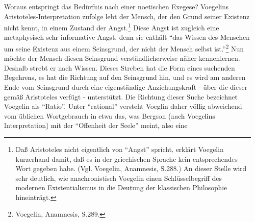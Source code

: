 Woraus entspringt das Bedürfnis nach einer noetischen Exegese? Voegelins
Aristoteles-Interpretation zufolge lebt der Mensch, der den Grund seiner
Existenz nicht kennt, in einem Zustand der Angst.\footnote{Daß
  Aristoteles nicht eigentlich von "`Angst"' spricht, erklärt Voegelin
  kurzerhand damit, daß es in der griechischen Sprache kein
  entsprechendes Wort gegeben habe.  (Vgl. Voegelin, Anamnesis, S.288.)
  An dieser Stelle wird sehr deutlich, wie anachronistisch Voegelin
  einen Schlüsselbegriff des modernen Existentialismus in die Deutung
  der klassischen Philosophie hineinträgt.}  Diese Angst ist zugleich
eine metaphysisch sehr informative Angst, denn sie enthält "`das Wissen
des Menschen um seine Existenz aus einem Seinsgrund, der nicht der
Mensch selbst ist."'\footnote{Voegelin, Anamnesis, S.289.} Nun möchte
der Mensch diesen Seinsgrund verständlicherweise näher kennenlernen.
Deshalb strebt er nach Wissen. Dieses Streben hat die Form eines
suchenden Begehrens, es hat die Richtung auf den Seinsgrund hin, und es
wird am anderen Ende vom Seinsgrund durch eine eigenständige
Anziehungskraft - über die dieser gemäß Aristoteles verfügt -
unterstützt. Die Richtung dieser Suche bezeichnet Voegelin als
"`Ratio"'. Unter "`rational"' versteht Voeglin daher völlig abweichend
vom üblichen Wortgebrauch in etwa das, was Bergson (nach Voegelins
Interpretation) mit der "`Offenheit der Seele"' meint, also eine
